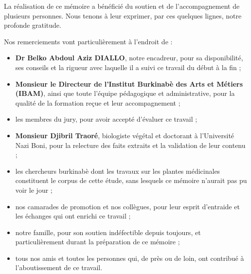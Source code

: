 La réalisation de ce mémoire a bénéficié du soutien et de l'accompagnement de plusieurs personnes. Nous tenons à leur exprimer, par ces quelques lignes, notre profonde gratitude.

Nos remerciements vont particulièrement à l'endroit de :

\begin{itemize}[label=, leftmargin=1cm, itemsep=6pt]
    \item \textbf{Dr Belko Abdoul Aziz DIALLO}, notre encadreur, pour sa disponibilité, ses conseils et la rigueur avec laquelle il a suivi ce travail du début à la fin ;

    \item \textbf{Monsieur le Directeur de l'Institut Burkinabè des Arts et Métiers (IBAM)}, ainsi que toute l'équipe pédagogique et administrative, pour la qualité de la formation reçue et leur accompagnement ;

    \item les membres du jury, pour avoir accepté d'évaluer ce travail ;

    \item \textbf{Monsieur Djibril Traoré}, biologiste végétal et doctorant à l'Université Nazi Boni, pour la relecture des faits extraits et la validation de leur contenu ;

    \item les chercheurs burkinabè dont les travaux sur les plantes médicinales constituent le corpus de cette étude, sans lesquels ce mémoire n'aurait pas pu voir le jour ;

    \item nos camarades de promotion et nos collègues, pour leur esprit d'entraide et les échanges qui ont enrichi ce travail ;

    \item notre famille, pour son soutien indéfectible depuis toujours, et particulièrement durant la préparation de ce mémoire ;

    \item tous nos amis et toutes les personnes qui, de près ou de loin, ont contribué à l'aboutissement de ce travail.
\end{itemize}
